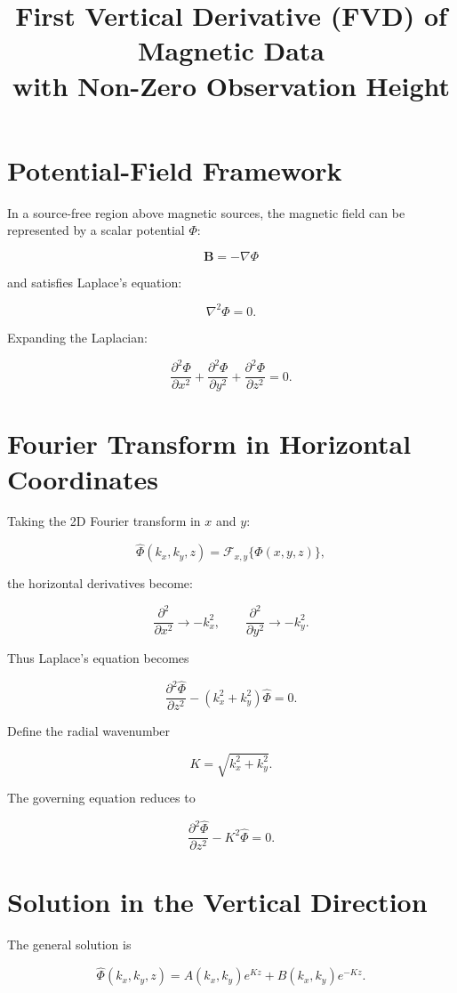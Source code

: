 \documentclass[11pt]{article}
\title{First Vertical Derivative (FVD) of Magnetic Data \\ 
with Non-Zero Observation Height}
\author{}
\date{}
\begin{document}
\maketitle

\section{Potential-Field Framework}

In a source-free region above magnetic sources, the magnetic field can be represented by a scalar potential $\Phi$:

\[
\mathbf{B} = -\nabla \Phi
\]

and satisfies Laplace's equation:

\[
\nabla^2 \Phi = 0.
\]

Expanding the Laplacian:

\[
\frac{\partial^2 \Phi}{\partial x^2}
+
\frac{\partial^2 \Phi}{\partial y^2}
+
\frac{\partial^2 \Phi}{\partial z^2}
=
0.
\]

\section{Fourier Transform in Horizontal Coordinates}

Taking the 2D Fourier transform in $x$ and $y$:

\[
\hat{\Phi}(k_x, k_y, z)
=
\mathcal{F}_{x,y}\{\Phi(x,y,z)\},
\]

the horizontal derivatives become:

\[
\frac{\partial^2}{\partial x^2} \rightarrow -k_x^2,
\qquad
\frac{\partial^2}{\partial y^2} \rightarrow -k_y^2.
\]

Thus Laplace's equation becomes

\[
\frac{\partial^2 \hat{\Phi}}{\partial z^2}
-
(k_x^2 + k_y^2)\hat{\Phi}
=
0.
\]

Define the radial wavenumber

\[
K = \sqrt{k_x^2 + k_y^2}.
\]

The governing equation reduces to

\[
\frac{\partial^2 \hat{\Phi}}{\partial z^2}
-
K^2 \hat{\Phi}
=
0.
\]

\section{Solution in the Vertical Direction}

The general solution is

\[
\hat{\Phi}(k_x,k_y,z)
=
A(k_x,k_y)e^{Kz}
+
B(k_x,k_y)e^{-Kz}.
\]
\end{document}
